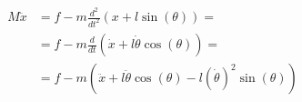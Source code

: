 \documentclass{article}
\begin{document}
\thispagestyle{empty}

\begin{align*}
M\ddot{x} & = f - m\frac{d^2}{dt^2}(x + l\sin(\theta)) = \\
          & = f - m\frac{d}{dt}(\dot{x} + l\dot{\theta}\cos(\theta)) = \\
          & = f - m(\ddot{x} + l\ddot{\theta}\cos(\theta) - l\left(\dot{\theta}\right)^2\sin(\theta))
\end{align*}
\end{document}
